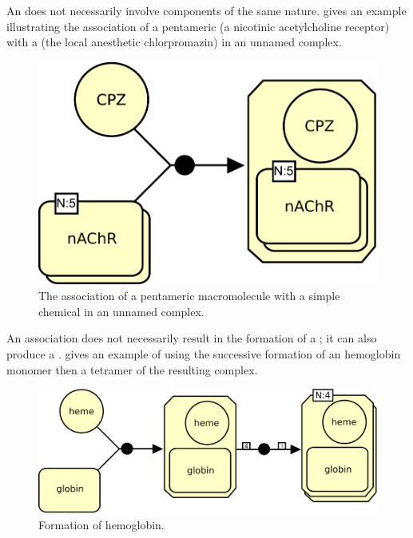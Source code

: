 An  does not necessarily involve components of the same nature.  gives an example illustrating the association of a pentameric  (a nicotinic acetylcholine receptor) with a  (the local anesthetic chlorpromazin) in an unnamed complex.

\begin{figure}[H]
  \centering
  \includegraphics[scale = 0.5]{images/association-unamed}
  \caption{The association of a pentameric macromolecule with a simple chemical in an unnamed complex.}
  \label{fig:assoc-unamed}
\end{figure}

An association does not necessarily result in the formation of a ; it can also produce a .  gives an example of using the successive formation of an hemoglobin monomer then a tetramer of the resulting complex.

\begin{figure}[H]
  \centering
  \includegraphics[scale = 0.5]{images/association-multimerisation}
  \caption{Formation of hemoglobin.}
  \label{fig:assoc-multi}
\end{figure}


